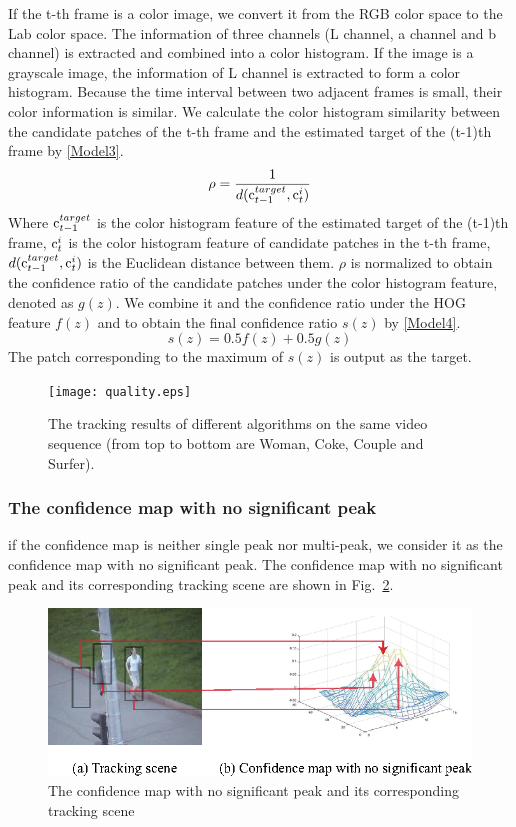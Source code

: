 \documentclass[conference]{IEEEtran}
\begin{document}
If the t-th frame is a color image, we convert it from the RGB color space to the Lab color space.
The information of three channels (L channel, a channel and b channel) is extracted and combined into a color histogram.
If the image is a grayscale image, the information of L channel is extracted to form a color histogram.
Because the time interval between two adjacent frames is small, their color information is similar.
We calculate the color histogram similarity between the candidate patches of the t-th frame and the estimated target of the (t-1)th frame by \eqref{Model3}.
\begin{equation}
	\rho = \frac{1}{d({\rm c}_{t-1}^{target},{\rm c}_t^{i})}
	\label{Model3}
\end{equation}
Where ${\rm c}_{t-1}^{target}$ is the color histogram feature of the estimated target of the (t-1)th frame, ${\rm c}_t^{i}$ is the color histogram feature of candidate patches in the t-th frame, $d({\rm c}_{t-1}^{target},{\rm c}_t^i)$ is the Euclidean distance between them.
$\rho$ is normalized to obtain the confidence ratio of the candidate patches under the color histogram feature, denoted as $g(z)$.
We combine it and the confidence ratio under the HOG feature $f(z)$ and to obtain the final confidence ratio $s(z)$ by \eqref{Model4}.
\begin{equation}
	s(z)=0.5f(z)+0.5g(z)
	\label{Model4}
\end{equation}
The patch corresponding to the maximum of $s(z)$ is output as the target.

\begin{figure}[t]
	\centering
	\texttt{[image: quality.eps]}
	\caption{The tracking results of different algorithms on the same video sequence (from top to bottom are Woman, Coke, Couple and Surfer).}
	\label{fig:qual}
\end{figure}


\subsubsection{The confidence map with no significant peak}
if the confidence map is neither single peak nor multi-peak, we consider it as the confidence map with no significant peak.
The confidence map with no significant peak and its corresponding tracking scene are shown in Fig.~\ref{fig:3}.
\begin{figure}[htbp]
	\centering
	\includegraphics[scale=1]{con3.eps}
	\caption{The confidence map with no significant peak and its corresponding tracking scene}
	\label{fig:3}
\end{figure}
\end{document}
